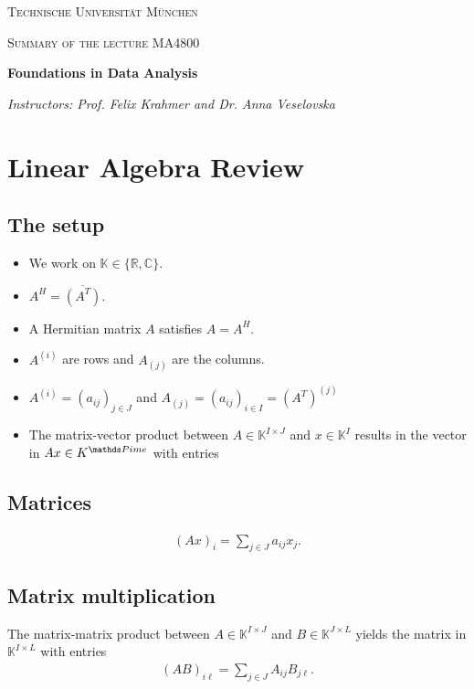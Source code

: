 \documentclass[a4paper, english, headtopline=0.08em, headsepline=0.04em, left = 1cm, right = 1cm, DIV=15]{article}
\begin{document}
{
    \begin{titlepage}
    	\centering
    	\vfill
    	{\scshape\LARGE Technische Universität München \par}
    	\vfill
    	{\scshape\Large Summary of the lecture MA4800\\   \par}
    	{\huge\bfseries Foundations in Data Analysis \par}
    	\vfill
    	{\Large\itshape Instructors: Prof. Felix Krahmer and Dr. Anna Veselovska \par}
    	\vfill
    \end{titlepage}
}

\tableofcontents
\clearpage 

\section{Linear Algebra Review}
\subsection{The setup}
\begin{itemize}
	\item We work on $\mathbb{K} \in\{\mathbb{R}, \mathbb{C}\}$.
	\item $A^H = \overline{(A^T)}$.
	\item A Hermitian matrix $A$ satisfies $A=A^H$.
	\item $A^{(i)}$ are rows and $A_{(j)}$ are the columns.
	\item $A^{(i)}=\left(a_{i j}\right)_{j \in J}$ 
	and $A_{(j)}=\left(a_{i j}\right)_{i \in I}=\left(A^{T}\right)^{(j)}$
	\item The matrix-vector product between 
	$A \in \mathbb{K}^{I \times J}$ and $x \in \mathbb{K}^{I}$ results in the vector in $A x \in K^{\PP ime}$ with entries
\end{itemize}
\subsection{Matrices}
\begin{align*}
	(A x)_{i}=\sum_{j \in J} a_{i j} x_{j} .
\end{align*}
\subsection{Matrix multiplication}
The matrix-matrix product between $A \in \mathbb{K}^{I\times J}$ and $B \in \mathbb{K}^{J \times L}$ yields the matrix in $\mathbb{K}^{I \times L}$ with entries
\begin{align*}
	(A B)_{i \ell}=\sum_{j \in J} A_{i j} B_{j \ell} .
\end{align*}
\end{document}
